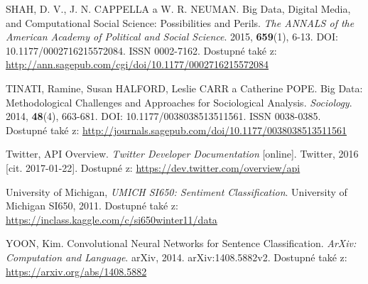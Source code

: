 \documentclass[12pt, a4paper]{article}
\numberwithin{equation}{section} 	%
\begin{document}
\begin{thebibliography}{99}
    SHAH, D. V., J. N. CAPPELLA a W. R. NEUMAN. Big Data, Digital Media, and Computational Social Science: Possibilities and Perils. \textit{The ANNALS of the American Academy of Political and Social Science}. 2015, \textbf{659}(1), 6-13. DOI: 10.1177/0002716215572084. ISSN 0002-7162. Dostupné také z: \url{http://ann.sagepub.com/cgi/doi/10.1177/0002716215572084}

    TINATI, Ramine, Susan HALFORD, Leslie CARR a Catherine POPE. Big Data: Methodological Challenges and Approaches for Sociological Analysis. \textit{Sociology}. 2014, \textbf{48}(4), 663-681. DOI: 10.1177/0038038513511561. ISSN 0038-0385. Dostupné také z: \url{http://journals.sagepub.com/doi/10.1177/0038038513511561}

    Twitter, API Overview. \textit{Twitter Developer Documentation} [online]. Twitter, 2016 [cit. 2017-01-22]. Dostupné z: \url{https://dev.twitter.com/overview/api}

    University of Michigan, \textit{UMICH SI650: Sentiment Classification}. University of Michigan SI650, 2011. Dostupné také z: \url{https://inclass.kaggle.com/c/si650winter11/data}

    YOON, Kim. Convolutional Neural Networks for Sentence Classification. \textit{ArXiv: Computation and Language}. arXiv, 2014. arXiv:1408.5882v2. Dostupné také z: \url{https://arxiv.org/abs/1408.5882}

\end{thebibliography}
\end{document}
